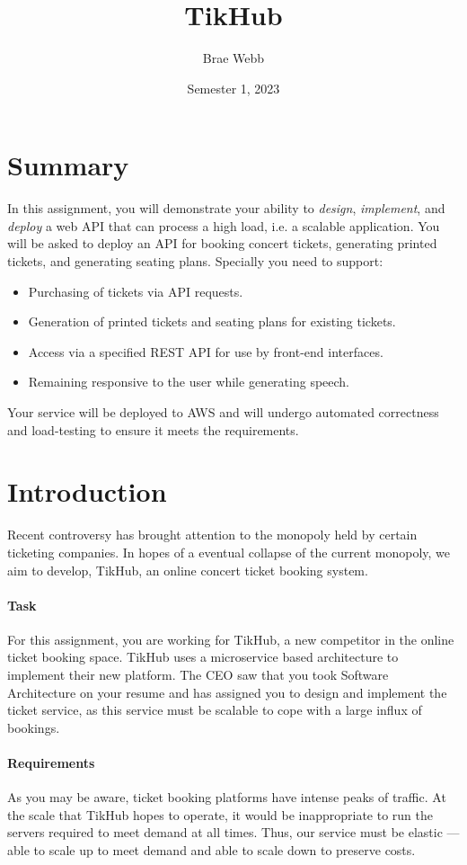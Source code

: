 \documentclass{csse4400}
\title{TikHub}
\author{Brae Webb}
\date{Semester 1, 2023}
\begin{document}
\maketitle

\section*{Summary}
In this assignment, you will demonstrate your ability to \textsl{design},
\textsl{implement}, and \textsl{deploy} a web API that can process a high load,
i.e. a scalable application.
You will be asked to deploy an API for booking concert tickets,
generating printed tickets, and generating seating plans.
Specially you need to support:
\begin{itemize}
    \item Purchasing of tickets via API requests.
    \item Generation of printed tickets and seating plans for existing tickets.
    \item Access via a specified REST API for use by front-end interfaces.
    \item Remaining responsive to the user while generating speech.
\end{itemize}

Your service will be deployed to AWS and will undergo automated correctness and load-testing to ensure it meets the requirements.

\section{Introduction}
Recent controversy has brought attention to the monopoly held by certain ticketing companies.
In hopes of a eventual collapse of the current monopoly,
we aim to develop, TikHub,
an online concert ticket booking system.

\paragraph{Task}
For this assignment,
you are working for TikHub,
a new competitor in the online ticket booking space.
TikHub uses a microservice based architecture to implement their new platform.
The CEO saw that you took Software Architecture on your resume and has assigned you to design and implement the ticket service,
as this service must be scalable to cope with a large influx of bookings.

\paragraph{Requirements}
As you may be aware,
ticket booking platforms have intense peaks of traffic.
At the scale that TikHub hopes to operate,
it would be inappropriate to run the servers required to meet demand at all times.
Thus, our service must be elastic --- able to scale up to meet demand and able to scale down to preserve costs.
\end{document}
